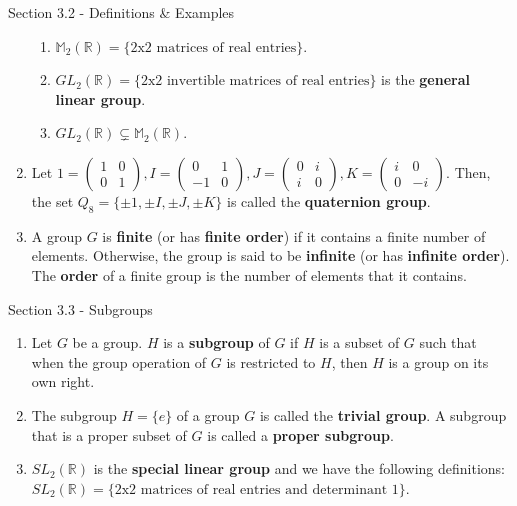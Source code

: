 \documentclass[12pt]{article}
\theoremstyle{definition}
\theoremstyle{named}
\begin{document}
\begin{section}{Section 3.2 - Definitions \& Examples}
\begin{enumerate}
\begin{enumerate}
            \item $\mathbb{M}_2(\mathbb{R}) = \{\textrm{2x2 matrices of real entries}\}$. 
            \item $GL_2(\mathbb{R}) = \{\textrm{2x2 invertible matrices of real entries}\}$ is the \textbf{general linear group}.
            \item $GL_2(\mathbb{R}) \subsetneq \mathbb{M}_2(\mathbb{R})$. 
        \end{enumerate}
        \item Let $1 = \begin{pmatrix}
            1 & 0 \\
            0 & 1
        \end{pmatrix}, I = \begin{pmatrix}
            0 & 1 \\
            -1 & 0
        \end{pmatrix}, J = \begin{pmatrix}
            0 & i \\
            i & 0
        \end{pmatrix}, K = \begin{pmatrix}
            i & 0 \\
            0 & -i
        \end{pmatrix}.$ Then, the set $Q_8 = \{\pm 1, \pm I, \pm J, \pm K\}$ is called the \textbf{quaternion group}. 
        \item A group $G$ is \textbf{finite} (or has \textbf{finite order}) if it contains a finite number of elements. Otherwise, the group is said to be \textbf{infinite} (or has \textbf{infinite order}). The \textbf{order} of a finite group is the number of elements that it contains. 
    \end{enumerate}
\end{section}

\begin{section}{Section 3.3 - Subgroups}
    \begin{enumerate}
        \item Let $G$ be a group. $H$ is a \textbf{subgroup} of $G$ if $H$ is a subset of $G$ such that when the group operation of $G$ is restricted to $H$, then $H$ is a group on its own right. 
        \item The subgroup $H = \{e\}$ of a group $G$ is called the \textbf{trivial group}. A subgroup that is a proper subset of $G$ is called a \textbf{proper subgroup}. 
        \item $SL_2(\mathbb{R})$ is the \textbf{special linear group} and we have the following definitions: $SL_2(\mathbb{R}) = \{\textrm{2x2 matrices of real entries and determinant 1}\}$. 
    \end{enumerate}
\end{section}
\end{document}
